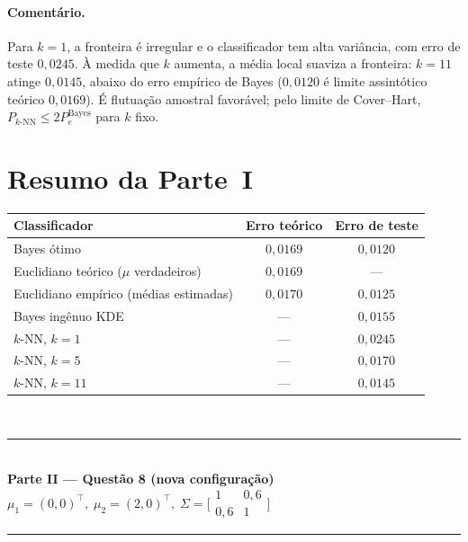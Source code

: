 ﻿\documentclass[12pt,a4paper]{article}
\begin{document}
\paragraph{Coment\'ario.} Para $k=1$, a fronteira \'e irregular e o
classificador tem alta vari\^ancia, com erro de teste $0{,}0245$. \`A
medida que $k$ aumenta, a m\'edia local suaviza a fronteira: $k=11$
atinge $0{,}0145$, abaixo do erro emp\'irico de Bayes ($0{,}0120$ \'e
limite assint\'otico te\'orico $0{,}0169$). \'E flutua\c{c}\~ao
amostral favor\'avel; pelo limite de Cover--Hart,
$P_{k\text{-NN}}\le 2P_e^{\mathrm{Bayes}}$ para $k$ fixo.

\FloatBarrier
\section*{Resumo da Parte~I}

\begin{center}
\begin{tabular}{lcc}
\toprule
Classificador & Erro te\'orico & Erro de teste\\
\midrule
Bayes \'otimo & $0{,}0169$ & $0{,}0120$\\
Euclidiano te\'orico ($\mu$ verdadeiros) & $0{,}0169$ & ---\\
Euclidiano emp\'irico (m\'edias estimadas) & $0{,}0170$ & $0{,}0125$\\
Bayes ing\^enuo KDE & --- & $0{,}0155$\\
$k$-NN, $k=1$ & --- & $0{,}0245$\\
$k$-NN, $k=5$ & --- & $0{,}0170$\\
$k$-NN, $k=11$ & --- & $0{,}0145$\\
\bottomrule
\end{tabular}\\[2pt]
\end{center}

\begin{center}
\rule{0.6\linewidth}{0.4pt}\\[2pt]
\textbf{\large Parte II --- Quest\~ao 8 (nova configura\c{c}\~ao)}\\[-2pt]
\small$\mu_1=(0,0)^\top,\;\mu_2=(2,0)^\top,\;\Sigma=\bigl[\begin{smallmatrix}1&0{,}6\\0{,}6&1\end{smallmatrix}\bigr]$\\
\rule{0.6\linewidth}{0.4pt}
\end{center}
\end{document}
